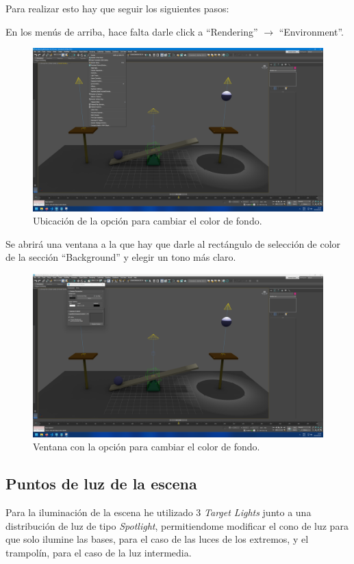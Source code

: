 \documentclass{article}
\begin{document}
\bigskip

Para realizar esto hay que seguir los siguientes pasos:

En los menús de arriba, hace falta darle click a ``Rendering'' $\rightarrow$ ``Environment''.

\begin{figure}[H]
    \centering
    \includegraphics[width=\textwidth]{imagenes/misc/bg-color1.png}
    \caption{Ubicación de la opción para cambiar el color de fondo.}
 \end{figure}

Se abrirá una ventana a la que hay que darle al rectángulo de selección de color de la sección ``Background'' y elegir un tono más claro.

\begin{figure}[H]
    \centering
    \includegraphics[width=\textwidth]{imagenes/misc/bg-color2.png}
    \caption{Ventana con la opción para cambiar el color de fondo.}
 \end{figure}

\subsection{Puntos de luz de la escena}
Para la iluminación de la escena he utilizado 3 \textit{Target Lights} junto a una distribución de luz de tipo \textit{Spotlight}, permitiendome modificar el cono de luz para que solo ilumine las bases, para el caso de las luces de los extremos, y el trampolín, para el caso de la luz intermedia.
\end{document}
